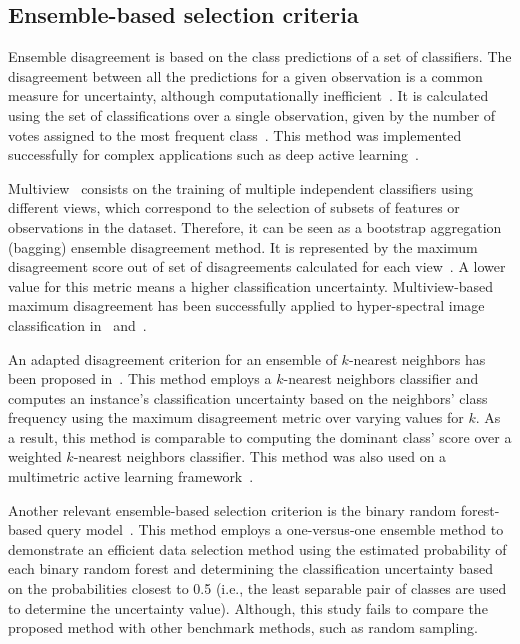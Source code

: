 \documentclass[parskip=full]{scrartcl}
\begin{document}
\subsection{Ensemble-based selection criteria}

Ensemble disagreement is based on the class predictions of a set of classifiers.
The disagreement between all the predictions for a given observation is a common
measure for uncertainty, although computationally
inefficient~\cite{Ruzicka2020,Pasolli2016}. It is calculated using the set of
classifications over a single observation, given by the number of votes assigned
to the most frequent class~\cite{Shrivastava2021}. This method was implemented
successfully for complex applications such as deep active
learning~\cite{Ruzicka2020}.

Multiview~\cite{Muslea2006} consists on the training of multiple independent
classifiers using different views, which correspond to the selection of subsets
of features or observations in the dataset. Therefore, it can be seen as a
bootstrap aggregation (bagging) ensemble disagreement method. It is represented
by the maximum disagreement score out of set of disagreements calculated for
each view~\cite{Shrivastava2021}. A lower value for this metric means a higher
classification uncertainty. Multiview-based maximum disagreement has been
successfully applied to hyper-spectral image classification in~\cite{Di2012}
and~\cite{Zhou2014}.

An adapted disagreement criterion for an ensemble of $k$-nearest neighbors has
been proposed in~\cite{Pasolli2016}. This method employs a $k$-nearest neighbors
classifier and computes an instance's classification uncertainty based on the
neighbors' class frequency using the maximum disagreement metric over varying
values for $k$. As a result, this method is comparable to computing the dominant
class' score over a weighted $k$-nearest neighbors classifier. This method was
also used on a multimetric active learning framework~\cite{Zhang2016}.

Another relevant ensemble-based selection criterion is the binary random
forest-based query model~\cite{Su2020}. This method employs a one-versus-one
ensemble method to demonstrate an efficient data selection method using the
estimated probability of each binary random forest and determining the
classification uncertainty based on the probabilities closest to 0.5 (i.e., the
least separable pair of classes are used to determine the uncertainty value).
Although, this study fails to compare the proposed method with other benchmark
methods, such as random sampling.
\end{document}
